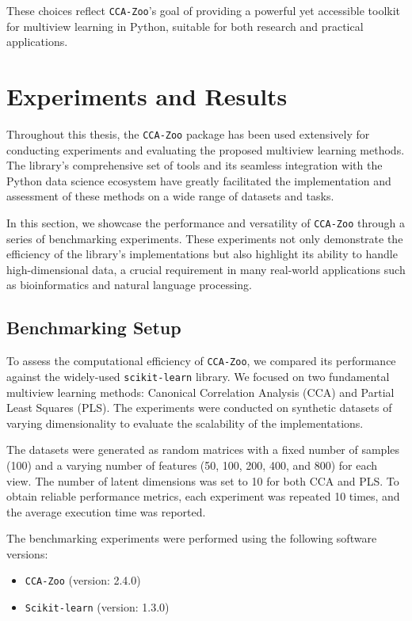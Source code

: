 These choices reflect \texttt{CCA-Zoo}'s goal of providing a powerful yet accessible toolkit for multiview learning in Python, suitable for both research and practical applications.

\section{Experiments and Results}\label{sec:experiments}

Throughout this thesis, the \texttt{CCA-Zoo} package has been used extensively for conducting experiments and evaluating the proposed multiview learning methods. The library's comprehensive set of tools and its seamless integration with the Python data science ecosystem have greatly facilitated the implementation and assessment of these methods on a wide range of datasets and tasks.

In this section, we showcase the performance and versatility of \texttt{CCA-Zoo} through a series of benchmarking experiments. These experiments not only demonstrate the efficiency of the library's implementations but also highlight its ability to handle high-dimensional data, a crucial requirement in many real-world applications such as bioinformatics and natural language processing.

\subsection{Benchmarking Setup}

To assess the computational efficiency of \texttt{CCA-Zoo}, we compared its performance against the widely-used \texttt{scikit-learn} library. We focused on two fundamental multiview learning methods: Canonical Correlation Analysis (CCA) and Partial Least Squares (PLS). The experiments were conducted on synthetic datasets of varying dimensionality to evaluate the scalability of the implementations.

The datasets were generated as random matrices with a fixed number of samples (100) and a varying number of features (50, 100, 200, 400, and 800) for each view. The number of latent dimensions was set to 10 for both CCA and PLS. To obtain reliable performance metrics, each experiment was repeated 10 times, and the average execution time was reported.

The benchmarking experiments were performed using the following software versions:

\begin{itemize}
\item \texttt{CCA-Zoo} (version: 2.4.0)
\item \texttt{Scikit-learn} (version: 1.3.0)
\end{itemize}

